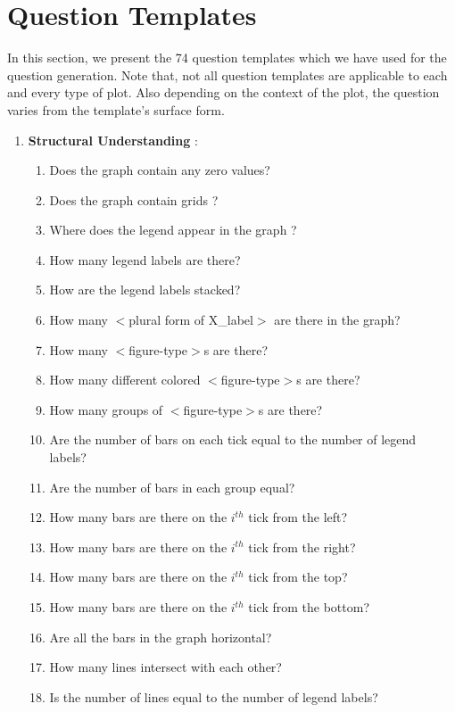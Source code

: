 \documentclass[10pt,twocolumn,letterpaper]{article}
\begin{document}
\section{Question Templates}
\label{templates}
In this section, we present the 74 question templates which we have used for the question generation. Note that, not all question templates are applicable to each and every type of plot. Also depending on the context of the plot, the question varies from the template's surface form.
\begin{enumerate}
    \item \textbf{Structural Understanding} :
    \begin{enumerate}[1.]
        \item Does the graph contain any zero values?
        \item Does the graph contain grids ?
        \item Where does the legend appear in the graph ?
        \item How many legend labels are there?
        \item How are the legend labels stacked?
        \item How many $<$plural form of X\_label$>$ are there in the graph?
        \item How many $<$figure-type$>$s are there?
        \item How many different colored $<$figure-type$>$s are there?
        \item How many groups of $<$figure-type$>$s are there?
        \item Are the number of bars on each tick equal to the number of legend labels?
        \item Are the number of bars in each group equal?
        \item How many bars are there on the $i^{th}$ tick from the left?
        \item How many bars are there on the $i^{th}$ tick from the right?
        \item How many bars are there on the $i^{th}$ tick from the top?
        \item How many bars are there on the $i^{th}$ tick from the bottom?
        \item Are all the bars in the graph horizontal?
        \item How many lines intersect with each other?
        \item Is the number of lines equal to the number of legend labels?
    \end{enumerate}
    

\end{enumerate}
\end{document}
